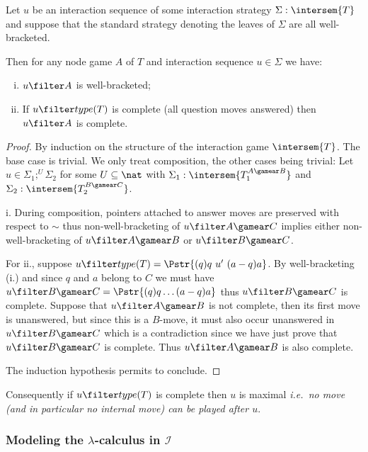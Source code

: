 \begin{lemma}
\label{lem:inter_complete}
Let $u$ be an interaction sequence of some interaction strategy $\Sigma : \intersem{T}$
and suppose that the standard strategy denoting the leaves of $\Sigma$ are all well-bracketed.

Then for any node game $A$ of $T$ and interaction sequence $u\in
\Sigma$ we have:
\begin{enumerate}[i.]
\item $u \filter A$ is well-bracketed;

\item If $u \filter type(T)$ is complete (all question moves answered) then
    $u \filter A$ is complete.
\end{enumerate}
\end{lemma}
\begin{proof}
By induction on the structure of the interaction game
$\intersem{T}$. The base case is trivial. We only treat composition,
the other cases being trivial: Let $ u \in \Sigma_1 ; ^U \Sigma_2$
for some $U \subseteq \nat$ with $\Sigma_1 : \intersem{T_1^{A\gamear
B}}$ and $\Sigma_2 : \intersem{T_2^{B\gamear C}}$.

i. During composition, pointers attached to answer moves are
preserved with respect to $\sim$ thus non-well-bracketing of
$u\filter A\gamear C$ implies either non-well-bracketing of
$u\filter A\gamear B$ or $u\filter B\gamear C$.

For ii., suppose $u \filter type(T) = \Pstr{(q)q\ u'\ (a-q)a }$. By
well-bracketing (i.) and since $q$ and $a$ belong to $C$ we must
have $u \filter B\gamear C = \Pstr{(q)q \ldots (a-q)a}$ thus $u
\filter B\gamear C$ is complete. Suppose that $u \filter A\gamear B$
is not complete, then its first move is unanswered, but since this
is a $B$-move, it must also occur unanswered in $u \filter B\gamear
C$ which is a contradiction since we have just prove that $u \filter
B\gamear C$ is complete. Thus $u \filter A\gamear B$ is also
complete.

The induction hypothesis permits to conclude.
\end{proof}
Consequently if $u\filter type(T)$ is complete then $u$ is maximal {\em i.e.~no move (and in particular no internal move) can be played after $u$}.

\subsubsection{Modeling the $\lambda$-calculus in $\mathcal{I}$}

